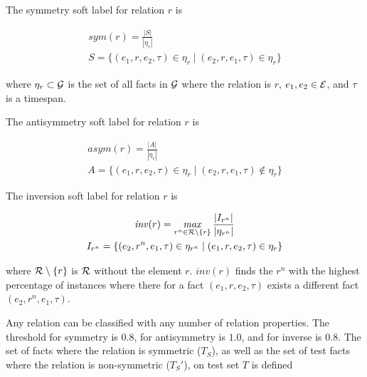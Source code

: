 The symmetry soft label for relation $r$ is

\begin{equation}
\begin{gathered}
\mathit{sym}(r) = \frac{|S|}{|\eta_r|}\\
S = \{ (e_1, r, e_2, \tau) \in \eta_r \mid (e_2, r, e_1, \tau) \in \eta_r \}
\end{gathered}
\end{equation}

\noindent
where $\eta_r \subset \mathcal{G}$ is the set of all facts in $\mathcal{G}$ where the relation is $r$, $e_1, e_2 \in \mathcal{E}$, and $\tau$ is a timespan. 

The antisymmetry soft label for relation $r$ is

\begin{equation}
\begin{gathered}
\mathit{asym}(r) = \frac{|A|}{|\eta_r|}\\
A = \{ (e_1, r, e_2, \tau) \in \eta_r \mid (e_2, r, e_1, \tau) \notin \eta_r \}
\end{gathered}
\end{equation}

The inversion soft label for relation $r$ is

\begin{equation}
\begin{gathered}
\mathit{inv}(r) = \operatorname*{\mathit{max}}\limits_{r^n \in \mathcal{R} \setminus \{r\} } \frac{|I_{r^n}|}{|\eta_{r^n}|}\\
I_{r^n} = \{ (e_2, r^n, e_1, \tau) \in \eta_{r^n}  \mid (e_1, r, e_2, \tau) \in \eta_r \}
\end{gathered}
\end{equation}

\noindent
where $\mathcal{R} \setminus \{r\}$ is $\mathcal{R}$ without the element $r$.
$\mathit{inv}(r)$ finds the $r^n$ with the highest percentage of instances where there for a fact $(e_1, r, e_2, \tau)$ exists a different fact $(e_2, r^n, e_1, \tau)$.



Any relation can be classified with any number of relation properties. The threshold for symmetry is $0.8$, for antisymmetry is $1.0$, and for inverse is $0.8$.
The set of facts where the relation is symmetric ($T_S$), as well as the set of test facts where the relation is non-symmetric ($T_S'$), on test set $T$ is defined

